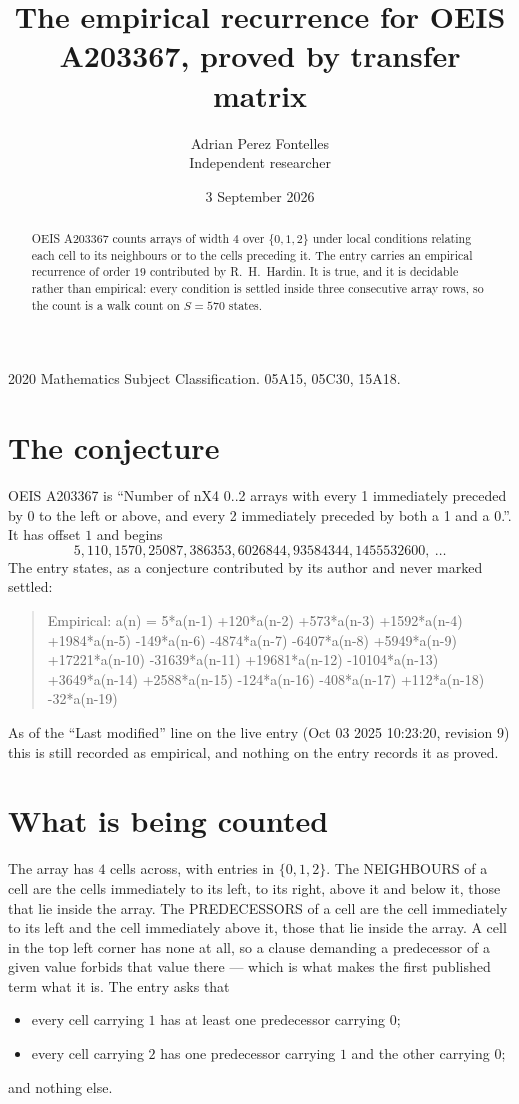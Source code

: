 \documentclass[11pt,a4paper]{article}
\title{The empirical recurrence for OEIS A203367, proved by transfer matrix}
\author{Adrian Perez Fontelles\\ \small Independent researcher}
\date{3 September 2026}
\theoremstyle{plain}
\theoremstyle{definition}
\begin{document}
\maketitle

\begin{abstract}
OEIS A203367 counts arrays of width $4$ over $\{0,1,2\}$ under local conditions relating each cell
to its neighbours or to the cells preceding it. The entry carries an empirical recurrence of
order $19$ contributed by R.~H.~Hardin. It is true, and it is decidable rather than
empirical: every condition is settled inside three consecutive array rows, so the count is a
walk count on $S=570$ states.
\end{abstract}

\noindent\small 2020 Mathematics Subject Classification. 05A15, 05C30, 15A18.\normalsize

\section{The conjecture}

OEIS A203367 is ``Number of nX4 0..2 arrays with every 1 immediately preceded by 0 to the left or above, and every 2 immediately preceded by both a 1 and a 0.''. It has offset $1$ and begins
\[
5, 110, 1570, 25087, 386353, 6026844, 93584344, 1455532600,\ \dots
\]
The entry states, as a conjecture contributed by its author and never marked settled:
\begin{quote}
Empirical: a(n) = 5*a(n-1) +120*a(n-2) +573*a(n-3) +1592*a(n-4) +1984*a(n-5) -149*a(n-6) -4874*a(n-7) -6407*a(n-8) +5949*a(n-9) +17221*a(n-10) -31639*a(n-11) +19681*a(n-12) -10104*a(n-13) +3649*a(n-14) +2588*a(n-15) -124*a(n-16) -408*a(n-17) +112*a(n-18) -32*a(n-19)
\end{quote}
As of the ``Last modified'' line on the live entry (Oct 03 2025 10:23:20, revision 9) this is still
recorded as empirical, and nothing on the entry records it as proved.

\section{What is being counted}

The array has $4$ cells across, with entries in $\{0,1,2\}$. The NEIGHBOURS of a cell are the
cells immediately to its left, to its right, above it and below it, those that lie inside the
array. The PREDECESSORS of a cell are the cell immediately to its left and the cell
immediately above it, those that lie inside the array. A cell in the top left corner has none
at all, so a clause demanding a predecessor of a given value forbids that value there --- which
is what makes the first published term what it is. The entry asks that
\begin{itemize}
\item every cell carrying $1$ has at least one predecessor carrying $0$;
\item every cell carrying $2$ has one predecessor carrying $1$ and the other carrying $0$;
\end{itemize}
and nothing else.
\end{document}
